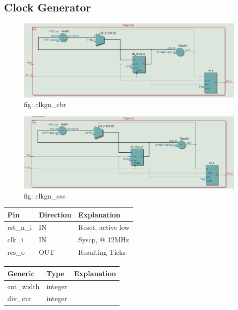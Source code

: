 \documentclass[12pt,a4 paper] {article}
\begin{document}
\subsection{Clock Generator}
\begin{figure}[h]
	\centering	
	\includegraphics[scale=0.2]{../png/clkgn_cbr.png}
	\newline
	fig: clkgn\_cbr\\
\end{figure}
\begin{figure}[h]
	\centering	
	\includegraphics[scale=0.2]{../png/clkgn_csc.png}
	\newline
	fig: clkgn\_csc\\
\end{figure}
\begin{center}
	\begin{tabular}{| p{2cm} | p{2cm} | p{4cm} |}
		\hline
		Pin & Direction  & Explanation\\
		\hline	
  		rst\_n\_i & IN & Reset, active low\\
  		\hline
		clk\_i   &IN & Syscp, @ 12MHz\\
		\hline
		res\_o   & OUT &Resulting Ticks\\
		\hline
		
	\end{tabular}
\end{center}
\begin{center}
	\begin{tabular}{| p{2cm} | p{2cm} | p{4cm} |}
	\hline
	Generic & Type & Explanation \\
	\hline
	cnt\_width & integer & \\
	\hline
	div\_cnt & integer & \\	
	\hline
	\end{tabular}	
\end{center}
\end{document}
